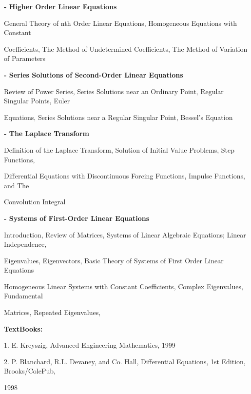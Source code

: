 \documentclass[12pt,a4paper]{article}
\begin{document}
\vspace{2pt}\textbf{- Higher Order Linear Equations}\par
General Theory of nth Order Linear Equations, Homogeneous Equations with Constant\par
Coefficients, The Method of Undetermined Coefficients, The Method of Variation of Parameters\par
\vspace{2pt}\textbf{- Series Solutions of Second-Order Linear Equations}\par
Review of Power Series, Series Solutions near an Ordinary Point, Regular Singular Points, Euler\par
Equations, Series Solutions near a Regular Singular Point, Bessel’s Equation\par
\vspace{2pt}\textbf{- The Laplace Transform}\par
Definition of the Laplace Transform, Solution of Initial Value Problems, Step Functions,\par
Differential Equations with Discontinuous Forcing Functions, Impulse Functions, and The\par
Convolution Integral\par
\vspace{2pt}\textbf{- Systems of First-Order Linear Equations}\par
Introduction, Review of Matrices, Systems of Linear Algebraic Equations; Linear Independence,\par
Eigenvalues, Eigenvectors, Basic Theory of Systems of First Order Linear Equations\par
Homogeneous Linear Systems with Constant Coefficients, Complex Eigenvalues, Fundamental\par
Matrices, Repeated Eigenvalues,\par\vspace{4pt}
\textbf{TextBooks:}\par\vspace{2pt}
1. E. Kreyszig, Advanced Engineering Mathematics, 1999\par
2. P. Blanchard, R.L. Devaney, and Co. Hall, Differential Equations, 1st Edition, Brooks/ColePub,\par
1998\par
\vspace{4pt}
\end{document}
